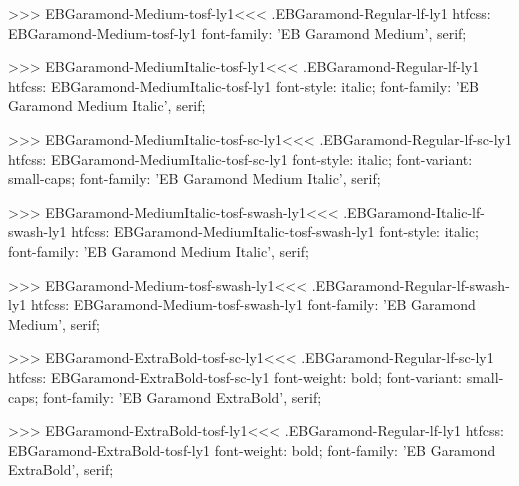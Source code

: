 {{>>>
\<EBGaramond-Medium-tosf-ly1\><<<
.EBGaramond-Regular-lf-ly1
htfcss:  EBGaramond-Medium-tosf-ly1  font-family: 'EB Garamond Medium', serif;

>>>
\<EBGaramond-MediumItalic-tosf-ly1\><<<
.EBGaramond-Regular-lf-ly1
htfcss:  EBGaramond-MediumItalic-tosf-ly1  font-style: italic; font-family: 'EB Garamond Medium Italic', serif;

>>>
\<EBGaramond-MediumItalic-tosf-sc-ly1\><<<
.EBGaramond-Regular-lf-sc-ly1
htfcss:  EBGaramond-MediumItalic-tosf-sc-ly1  font-style: italic; font-variant: small-caps; font-family: 'EB Garamond Medium Italic', serif;

>>>
\<EBGaramond-MediumItalic-tosf-swash-ly1\><<<
.EBGaramond-Italic-lf-swash-ly1
htfcss:  EBGaramond-MediumItalic-tosf-swash-ly1  font-style: italic; font-family: 'EB Garamond Medium Italic', serif;

>>>
\<EBGaramond-Medium-tosf-swash-ly1\><<<
.EBGaramond-Regular-lf-swash-ly1
htfcss:  EBGaramond-Medium-tosf-swash-ly1  font-family: 'EB Garamond Medium', serif;

>>>
\<EBGaramond-ExtraBold-tosf-sc-ly1\><<<
.EBGaramond-Regular-lf-sc-ly1
htfcss:  EBGaramond-ExtraBold-tosf-sc-ly1  font-weight: bold; font-variant: small-caps; font-family: 'EB Garamond ExtraBold', serif;

>>>
\<EBGaramond-ExtraBold-tosf-ly1\><<<
.EBGaramond-Regular-lf-ly1
htfcss:  EBGaramond-ExtraBold-tosf-ly1  font-weight: bold; font-family: 'EB Garamond ExtraBold', serif;

}}
